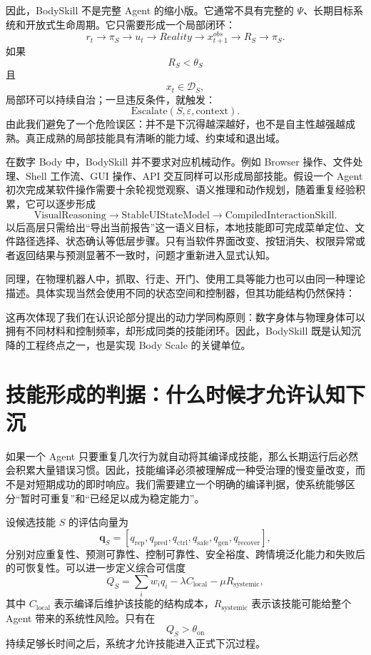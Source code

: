 因此，BodySkill 不是完整 Agent 的缩小版。它通常不具有完整的 $\Psi$、长期目标系统和开放式生命周期。它只需要形成一个局部闭环：
\[
r_t
\rightarrow
\pi_S
\rightarrow
u_t
\rightarrow
Reality
\rightarrow
x_{t+1}^{obs}
\rightarrow
R_S
\rightarrow
\pi_S.
\]
如果
\[
R_S<\theta_S
\]
且
\[
x_t\in\mathcal D_S,
\]
局部环可以持续自治；一旦违反条件，就触发：
\[
\mathrm{Escalate}(S,\varepsilon,\mathrm{context}).
\]
由此我们避免了一个危险误区：并不是下沉得越深越好，也不是自主性越强越成熟。真正成熟的局部技能具有清晰的能力域、约束域和退出域。

在数字 Body 中，BodySkill 并不要求对应机械动作。例如 Browser 操作、文件处理、Shell 工作流、GUI 操作、API 交互同样可以形成局部技能。假设一个 Agent 初次完成某软件操作需要十余轮视觉观察、语义推理和动作规划，随着重复经验积累，它可以逐步形成
\[
\mathrm{VisualReasoning}
\rightarrow
\mathrm{StableUIStateModel}
\rightarrow
\mathrm{CompiledInteractionSkill}.
\]
以后高层只需给出“导出当前报告”这一语义目标，本地技能即可完成菜单定位、文件路径选择、状态确认等低层步骤。只有当软件界面改变、按钮消失、权限异常或者返回结果与预测显著不一致时，问题才重新进入显式认知。

同理，在物理机器人中，抓取、行走、开门、使用工具等能力也可以由同一种理论描述。具体实现当然会使用不同的状态空间和控制器，但其功能结构仍然保持：
\begin{statementbox}
\centering
{}
\end{statementbox}
这再次体现了我们在认识论部分提出的动力学同构原则：数字身体与物理身体可以拥有不同材料和控制频率，却形成同类的技能闭环。因此，BodySkill 既是认知沉降的工程终点之一，也是实现 Body Scale 的关键单位。

\section{技能形成的判据：什么时候才允许认知下沉}

如果一个 Agent 只要重复几次行为就自动将其编译成技能，那么长期运行后必然会积累大量错误习惯。因此，技能编译必须被理解成一种受治理的慢变量改变，而不是对短期成功的即时响应。我们需要建立一个明确的编译判据，使系统能够区分“暂时可重复”和“已经足以成为稳定能力”。

设候选技能 $S$ 的评估向量为
\[
\mathbf q_S
=
\left[
q_{\mathrm{rep}},
q_{\mathrm{pred}},
q_{\mathrm{ctrl}},
q_{\mathrm{safe}},
q_{\mathrm{gen}},
q_{\mathrm{recover}}
\right],
\]
分别对应重复性、预测可靠性、控制可靠性、安全裕度、跨情境泛化能力和失败后的可恢复性。可以进一步定义综合可信度
\[
Q_S
=
\sum_i
w_i q_i
-
\lambda C_{\mathrm{local}}
-
\mu R_{\mathrm{systemic}},
\]
其中 $C_{\mathrm{local}}$ 表示编译后维护该技能的结构成本，$R_{\mathrm{systemic}}$ 表示该技能可能给整个 Agent 带来的系统性风险。只有在
\[
Q_S>\theta_{\mathrm{on}}
\]
持续足够长时间之后，系统才允许技能进入正式下沉过程。


